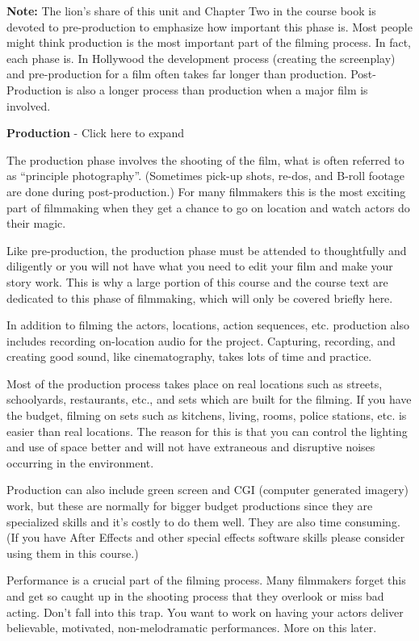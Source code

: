 \documentclass[
]{book}
\begin{document}
\textbf{Note:} The lion's share of this unit and Chapter Two in the course book is devoted to pre-production to emphasize how important this phase is. Most people might think production is the most important part of the filming process. In fact, each phase is. In Hollywood the development process (creating the screenplay) and pre-production for a film often takes far longer than production. Post-Production is also a longer process than production when a major film is involved.

\textbf{Production} - Click here to expand

The production phase involves the shooting of the film, what is often referred to as ``principle photography''. (Sometimes pick-up shots, re-dos, and B-roll footage are done during post-production.) For many filmmakers this is the most exciting part of filmmaking when they get a chance to go on location and watch actors do their magic.

Like pre-production, the production phase must be attended to thoughtfully and diligently or you will not have what you need to edit your film and make your story work. This is why a large portion of this course and the course text are dedicated to this phase of filmmaking, which will only be covered briefly here.

In addition to filming the actors, locations, action sequences, etc. production also includes recording on-location audio for the project. Capturing, recording, and creating good sound, like cinematography, takes lots of time and practice.

Most of the production process takes place on real locations such as streets, schoolyards, restaurants, etc., and sets which are built for the filming. If you have the budget, filming on sets such as kitchens, living, rooms, police stations, etc. is easier than real locations. The reason for this is that you can control the lighting and use of space better and will not have extraneous and disruptive noises occurring in the environment.

Production can also include green screen and CGI (computer generated imagery) work, but these are normally for bigger budget productions since they are specialized skills and it's costly to do them well. They are also time consuming. (If you have After Effects and other special effects software skills please consider using them in this course.)

Performance is a crucial part of the filming process. Many filmmakers forget this and get so caught up in the shooting process that they overlook or miss bad acting. Don't fall into this trap. You want to work on having your actors deliver believable, motivated, non-melodramatic performances. More on this later.
\end{document}
